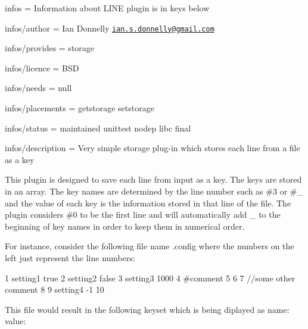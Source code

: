 
\begin{DoxyItemize}
\item infos = Information about L\+I\+N\+E plugin is in keys below
\item infos/author = Ian Donnelly \href{mailto:ian.s.donnelly@gmail.com}{\tt ian.\+s.\+donnelly@gmail.\+com}
\item infos/provides = storage
\item infos/licence = B\+S\+D
\item infos/needs = null
\item infos/placements = getstorage setstorage
\item infos/status = maintained unittest nodep libc final
\item infos/description = Very simple storage plug-\/in which stores each line from a file as a key
\end{DoxyItemize}

This plugin is designed to save each line from input as a key. The keys are stored in an array. The key names are determined by the line number such as {\ttfamily \#3} or {\ttfamily \#\+\_} and the value of each key is the information stored in that line of the file. The plugin considers {\ttfamily \#0} to be the first line and will automatically add {\ttfamily \+\_\+} to the beginning of key names in order to keep them in numerical order.

For instance, consider the following file name {\ttfamily .config} where the numbers on the left just represent the line numbers\+: \begin{DoxyVerb}1  setting1 true
2  setting2 false
3  setting3 1000
4  #comment
5
6
7  //some other comment
8
9  setting4 -1
10 
\end{DoxyVerb}


This file would result in the following keyset which is being diplayed as {\ttfamily name\+: value}\+: 
 